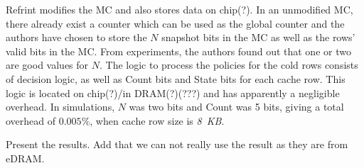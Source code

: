 
Refrint modifies the MC and also stores data on chip(?). In an unmodified MC, there already exist a counter which can be used as the global counter and the authors have chosen to store the $N$ snapshot bits in the MC as well as the rows' valid bits in the MC. From experiments, the authors found out that one or two are good values for $N$. The logic to process the policies for the cold rows consists of decision logic, as well as Count bits and State bits for each cache row. This logic is located on chip(?)/in DRAM(?)(???) and has apparently a negligible overhead. In simulations, $N$ was two bits and Count was 5 bits, giving a total overhead of $0.005\%$, when cache row size is \textit{8~KB}.

Present the results. Add that we can not really use the result as they are from eDRAM.
